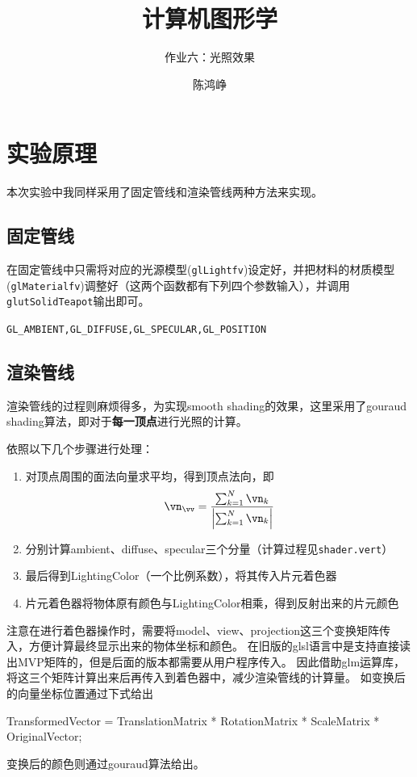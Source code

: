 \documentclass[logo,reportComp]{thesis}
\title{计算机图形学}
\subtitle{作业六：光照效果}
\author{陈鸿峥}
\begin{document}
\maketitle

\section{实验原理}
本次实验中我同样采用了固定管线和渲染管线两种方法来实现。

\subsection{固定管线}
在固定管线中只需将对应的光源模型(\verb'glLightfv')设定好，并把材料的材质模型(\verb'glMaterialfv')调整好（这两个函数都有下列四个参数输入），并调用\verb'glutSolidTeapot'输出即可。
\begin{center}
\verb'GL_AMBIENT,GL_DIFFUSE,GL_SPECULAR,GL_POSITION'
\end{center}

\subsection{渲染管线}
渲染管线的过程则麻烦得多，为实现smooth shading的效果，这里采用了gouraud shading算法，即对于\textbf{每一顶点}进行光照的计算。

依照以下几个步骤进行处理：
\begin{enumerate}
	\item 对顶点周围的面法向量求平均，得到顶点法向，即
	\[\vn_\vv=\frac{\sum_{k=1}^N\vn_k}{\left|\sum_{k=1}^N\vn_k\right|}\]
	\item 分别计算ambient、diffuse、specular三个分量（计算过程见\verb'shader.vert'）
	\item 最后得到LightingColor（一个比例系数），将其传入片元着色器
	\item 片元着色器将物体原有颜色与LightingColor相乘，得到反射出来的片元颜色
\end{enumerate}

注意在进行着色器操作时，需要将model、view、projection这三个变换矩阵传入，方便计算最终显示出来的物体坐标和颜色。
在旧版的glsl语言中是支持直接读出MVP矩阵的，但是后面的版本都需要从用户程序传入。
因此借助glm运算库，将这三个矩阵计算出来后再传入到着色器中，减少渲染管线的计算量。
如变换后的向量坐标位置通过下式给出
\begin{center}
TransformedVector = TranslationMatrix * RotationMatrix * ScaleMatrix * OriginalVector;
\end{center}
变换后的颜色则通过gouraud算法给出。
\end{document}
